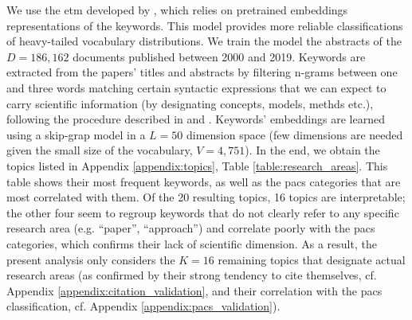\documentclass{article}
\begin{document}
We use the \gls{etm} developed by \citealt{Dieng2020}, which relies on pretrained embeddings representations of the keywords. This model provides more reliable classifications of heavy-tailed vocabulary distributions. %
We train the model the abstracts of the $D=186,162$ documents published between 2000 and 2019. Keywords are extracted from the papers' titles and abstracts by filtering n-grams between one and three words matching certain syntactic expressions that we can expect to carry scientific information (by designating concepts, models, methds etc.), following the procedure described in \citealt{Gautheron2023} and \citealt{omodei_tel-01097702}. Keywords' embeddings are learned using a skip-grap model in a $L=50$ dimension space (few dimensions are needed given the small size of the vocabulary, $V=4,751$). In the end, we obtain the topics listed in Appendix \ref{appendix:topics}, Table \ref{table:research_areas}. This table shows their most frequent keywords, as well as the \gls{pacs} categories that are most correlated with them. Of the 20 resulting topics, 16 topics are interpretable; the other four seem to regroup keywords that do not clearly refer to any specific research area (e.g. ``paper'', ``approach'') and correlate poorly with the \gls{pacs} categories, which confirms their lack of scientific dimension. As a result, the present analysis only considers the $K=16$ remaining topics that designate actual research areas (as confirmed by their strong tendency to cite themselves, cf. Appendix \ref{appendix:citation_validation}, and their correlation with the \gls{pacs} classification, cf. Appendix \ref{appendix:pacs_validation}).

\end{document}
